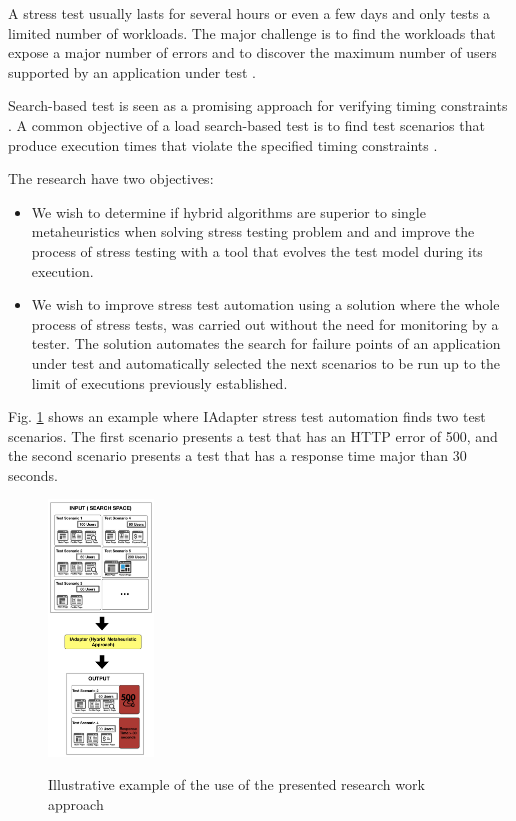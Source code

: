 \documentclass[conference]{IEEEtran}
\begin{document}
A stress test usually lasts for several hours or even a few days and only tests a limited number of workloads. The major challenge is to find the workloads that expose a major number of errors and to discover the maximum number of users supported by an application under test \cite{Barna2011}. 

Search-based test is seen as a promising approach for verifying timing constraints \cite{Afzal2009a}. A common objective of a load search-based test is to find test scenarios that produce execution times that violate the specified timing constraints \cite{Sullivan}. 

The research have two objectives:

\begin{itemize}
\item  We wish to determine if hybrid algorithms are superior to single metaheuristics when solving stress testing problem and and improve the process of stress testing with a tool that evolves the test model during its execution. 
\item  We wish to improve stress test automation using a solution where the whole process of stress tests, was carried out without the need for monitoring by a tester. The solution automates the search for failure points of an application under test and automatically selected the next scenarios to be run up to the limit of executions previously established.
\end{itemize}


Fig. \ref{fig:solution} shows an example where IAdapter stress test automation finds two test scenarios. The first scenario presents a test that has an HTTP error of 500, and the second scenario presents a test that has a response time major than 30 seconds. 

\begin{figure}[ht]
\centering
\caption{Illustrative example of the use of the presented research work approach}
\includegraphics[width=0.25\textwidth]{./images/solution.png}
\label{fig:solution}
\end{figure}
\end{document}
